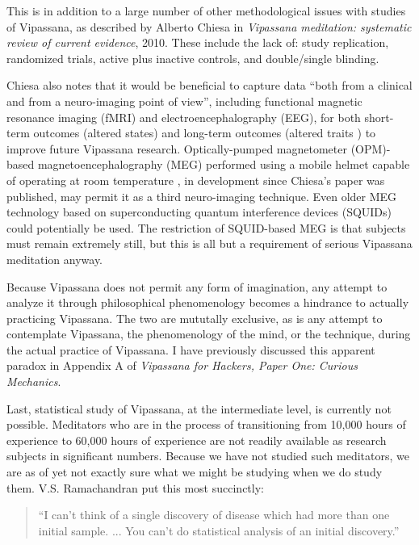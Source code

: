 \documentclass[a4paper, amsfonts, amssymb, amsmath, reprint, showkeys, nofootinbib, twoside]{revtex4-1}
\begin{document}
This is in addition to a large number of other
methodological issues with studies of Vipassana, as described by Alberto Chiesa in
\textit{Vipassana meditation: systematic review of current evidence},
2010. \cite{chiesa2010vipassana} These include the lack of: study replication,
randomized trials, active plus inactive controls, and double/single blinding.

Chiesa also notes that it would be beneficial to capture data ``both from a clinical
and from a neuro-imaging point of view'', including functional magnetic resonance
imaging (fMRI) and electroencephalography (EEG), for both short-term outcomes
(altered states) and long-term outcomes (altered traits \cite{davidson1977role}) to
improve future Vipassana research. \cite{chiesa2010vipassana}
Optically-pumped magnetometer (OPM)-based magnetoencephalography (MEG) performed using a
mobile helmet capable of operating at room temperature \cite{boto2017new}, in development since Chiesa's
paper was published, may permit it as a third neuro-imaging technique. Even older MEG
technology based on superconducting quantum interference devices (SQUIDs) could
potentially be used. The restriction of SQUID-based MEG is that subjects must remain
extremely still, but this is all but a requirement of serious Vipassana meditation
anyway.

Because Vipassana does not permit any form of imagination, any attempt to analyze it
through philosophical phenomenology becomes a hindrance to actually practicing
Vipassana. \cite{patrik1994phenomenological} The two are mututally exclusive, as is
any attempt to contemplate Vipassana, the phenomenology of the mind, or the
technique, during the actual practice of Vipassana. I have previously discussed this
apparent paradox in Appendix A of \textit{Vipassana for Hackers, Paper One: Curious Mechanics}.
\cite{deobald2017curious}

Last, statistical study of Vipassana, at the intermediate level, is currently not
possible. Meditators who are in the process of transitioning from 10,000 hours of
experience to 60,000 hours of experience are not readily available as research
subjects in significant numbers. Because we have not studied such meditators, we are
as of yet not exactly sure what we might be studying when we do study
them. V.S. Ramachandran put this most succinctly:

\begin{quotation}
  ``I can't think of a single discovery of disease which had more than one initial
  sample. ... You can't do statistical analysis of an initial discovery.''
  \cite{ramachandran2019relevance}
\end{quotation}
\end{document}
